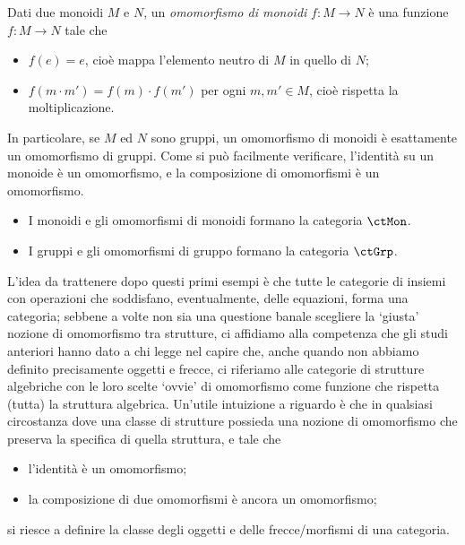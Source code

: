 \begin{example}\label{ex_cat_monoidi}
 Dati due monoidi \(M\) e \(N\), un \emph{omomorfismo di monoidi} \(f\colon M\to N\) è una funzione \(f\colon M\to N\) tale che
 \begin{itemize}
  \item \(f(e) = e\), cioè mappa l'elemento neutro di \(M\) in quello di \(N\);
  \item \(f(m\cdot m')=f(m)\cdot f(m')\) per ogni \(m,m'\in M\), cioè rispetta la moltiplicazione.
 \end{itemize}
 In particolare, se \(M\) ed \(N\) sono gruppi, un omomorfismo di monoidi è esattamente un omomorfismo di gruppi.
 Come si può facilmente verificare, l'identità su un monoide è un omomorfismo, e la composizione di omomorfismi è un omomorfismo.
 \begin{itemize}
  \item I monoidi e gli omomorfismi di monoidi formano la categoria \(\ctMon\).
  \item I gruppi e gli omomorfismi di gruppo formano la categoria \(\ctGrp\).
 \end{itemize}
\end{example}
L'idea da trattenere dopo questi primi esempi è che tutte le categorie di insiemi con operazioni che soddisfano, eventualmente, delle equazioni, forma una categoria; sebbene a volte non sia una questione banale scegliere la `giusta' nozione di omomorfismo tra strutture, ci affidiamo alla competenza che gli studi anteriori hanno dato a chi legge nel capire che, anche quando non abbiamo definito precisamente oggetti e frecce, ci riferiamo alle categorie di strutture algebriche con le loro scelte `ovvie' di omomorfismo come funzione che rispetta (tutta) la struttura algebrica. Un'utile intuizione a riguardo è che in qualsiasi circostanza dove una classe di strutture possieda una nozione di omomorfismo che preserva la specifica di quella struttura, e tale che
\begin{itemize}
 \item l'identità è un omomorfismo;
 \item la composizione di due omomorfismi è ancora un omomorfismo;
\end{itemize}
si riesce a definire la classe degli oggetti e delle frecce/morfismi di una categoria.

